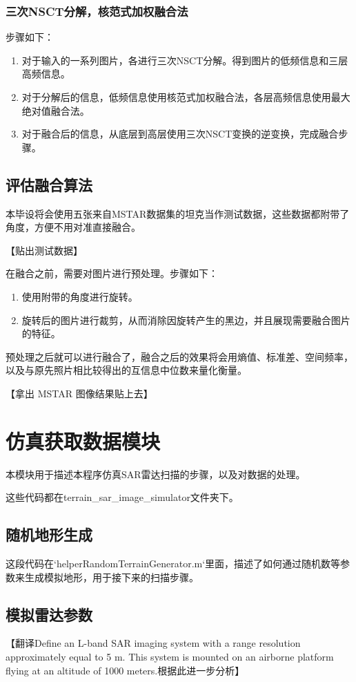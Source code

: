 \documentclass{xduugthesis}
\begin{document}
\subsubsection{三次NSCT分解，核范式加权融合法}
步骤如下：
\begin{enumerate}
	\item 对于输入的一系列图片，各进行三次NSCT分解。得到图片的低频信息和三层高频信息。
	\item 对于分解后的信息，低频信息使用核范式加权融合法，各层高频信息使用最大绝对值融合法。
	\item 对于融合后的信息，从底层到高层使用三次NSCT变换的逆变换，完成融合步骤。
\end{enumerate}


\subsection{评估融合算法}
本毕设将会使用五张来自MSTAR数据集的坦克当作测试数据，这些数据都附带了角度，方便不用对准直接融合。\par
【贴出测试数据】\par
在融合之前，需要对图片进行预处理。步骤如下：
\begin{enumerate}
\item 使用附带的角度进行旋转。
\item 旋转后的图片进行裁剪，从而消除因旋转产生的黑边，并且展现需要融合图片的特征。
\end{enumerate}
预处理之后就可以进行融合了，融合之后的效果将会用熵值、标准差、空间频率，以及与原先照片相比较得出的互信息中位数来量化衡量。\par
【拿出 MSTAR 图像结果贴上去】
\section{仿真获取数据模块}
本模块用于描述本程序仿真SAR雷达扫描的步骤，以及对数据的处理。\par
这些代码都在terrain\_sar\_image\_simulator文件夹下。
\subsection{随机地形生成}
这段代码在`helperRandomTerrainGenerator.m`里面，描述了如何通过随机数等参数来生成模拟地形，用于接下来的扫描步骤。\par
[描写获取的参数]
[描写生成的步骤]
[贴图表示地形]
\subsection{模拟雷达参数}
【翻译Define an L-band SAR imaging system with a range resolution approximately equal to 5 m. This system is mounted on an airborne platform flying at an altitude of 1000 meters.根据此进一步分析】
\end{document}

